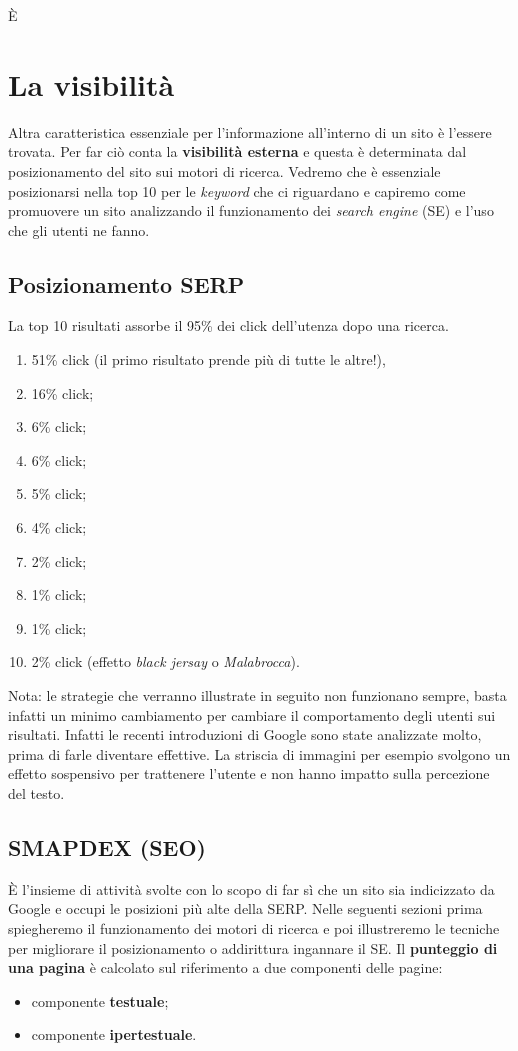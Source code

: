 
È\chapter{La visibilità}

	Altra caratteristica essenziale per l'informazione all'interno di un sito è l'essere trovata. Per far ciò conta la \textbf{visibilità esterna} e questa è determinata dal posizionamento del sito sui motori di ricerca. 
	Vedremo che è essenziale posizionarsi nella top 10 per le \emph{keyword} che ci riguardano e capiremo come promuovere un sito analizzando il funzionamento dei \emph{search engine} (SE) e l'uso che gli utenti ne fanno.

	\section{Posizionamento SERP}	
		La top 10 risultati assorbe il 95\% dei click dell'utenza dopo una ricerca.
		\begin{enumerate}
			\item 51\% click (il primo risultato prende più di tutte le altre!),
			\item 16\% click;
			\item 6\% click;
			\item 6\% click;
			\item 5\% click;
			\item 4\% click;
			\item 2\% click;
			\item 1\% click;
			\item 1\% click;
			\item 2\% click (effetto \emph{black jersay} o \emph{Malabrocca}).		
		\end{enumerate}
		
		Nota: le strategie che verranno illustrate in seguito non funzionano sempre, basta infatti un minimo cambiamento per cambiare il comportamento degli utenti sui risultati. Infatti le recenti introduzioni di Google sono state analizzate molto, prima di farle diventare effettive. La striscia di immagini per esempio svolgono un effetto sospensivo per trattenere l'utente e non hanno impatto sulla percezione del testo.
	
	\section{SMAPDEX (SEO)}
		È l'insieme di attività svolte con lo scopo di far sì che un sito sia indicizzato da Google e occupi le posizioni più alte della SERP. Nelle seguenti sezioni prima spiegheremo il funzionamento dei motori di ricerca e poi illustreremo le tecniche per migliorare il posizionamento o addirittura ingannare il SE.
		Il \textbf{punteggio di una pagina} è calcolato sul riferimento a due componenti delle pagine:
		\begin{itemize}
			\item componente \textbf{testuale};
			\item componente \textbf{ipertestuale}.
		\end{itemize}
		
